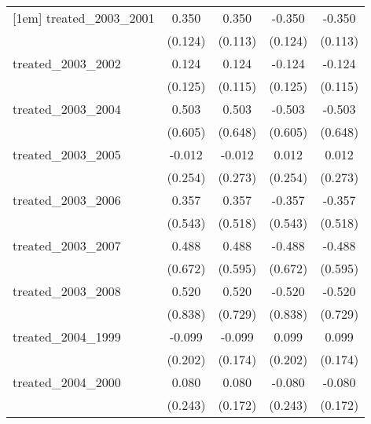 {\begin{tabular}{l*{4}{c}}
[1em]
treated\_2003\_2001&       0.350\sym{**} &       0.350\sym{**} &      -0.350\sym{**} &      -0.350\sym{**} \\
            &     (0.124)         &     (0.113)         &     (0.124)         &     (0.113)         \\
[1em]
treated\_2003\_2002&       0.124         &       0.124         &      -0.124         &      -0.124         \\
            &     (0.125)         &     (0.115)         &     (0.125)         &     (0.115)         \\
[1em]
treated\_2003\_2004&       0.503         &       0.503         &      -0.503         &      -0.503         \\
            &     (0.605)         &     (0.648)         &     (0.605)         &     (0.648)         \\
[1em]
treated\_2003\_2005&      -0.012         &      -0.012         &       0.012         &       0.012         \\
            &     (0.254)         &     (0.273)         &     (0.254)         &     (0.273)         \\
[1em]
treated\_2003\_2006&       0.357         &       0.357         &      -0.357         &      -0.357         \\
            &     (0.543)         &     (0.518)         &     (0.543)         &     (0.518)         \\
[1em]
treated\_2003\_2007&       0.488         &       0.488         &      -0.488         &      -0.488         \\
            &     (0.672)         &     (0.595)         &     (0.672)         &     (0.595)         \\
[1em]
treated\_2003\_2008&       0.520         &       0.520         &      -0.520         &      -0.520         \\
            &     (0.838)         &     (0.729)         &     (0.838)         &     (0.729)         \\
[1em]
treated\_2004\_1999&      -0.099         &      -0.099         &       0.099         &       0.099         \\
            &     (0.202)         &     (0.174)         &     (0.202)         &     (0.174)         \\
[1em]
treated\_2004\_2000&       0.080         &       0.080         &      -0.080         &      -0.080         \\
            &     (0.243)         &     (0.172)         &     (0.243)         &     (0.172)         \\

\end{tabular}}
